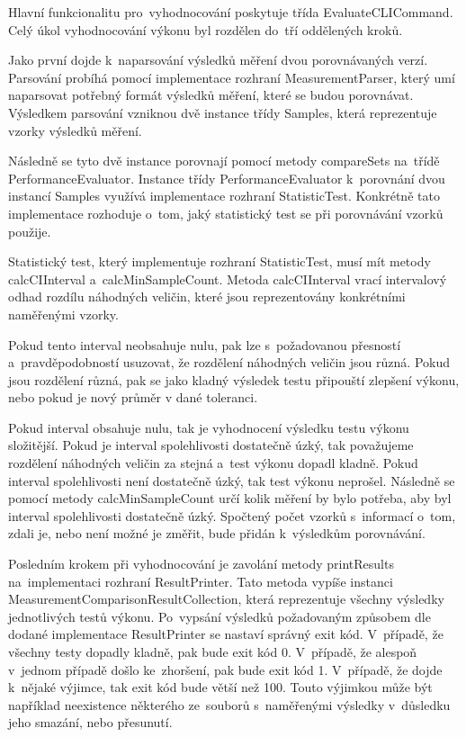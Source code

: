 Hlavní funkcionalitu pro~vyhodnocování poskytuje třída EvaluateCLICommand. Celý úkol vyhodnocování výkonu
byl rozdělen do~tří oddělených kroků.

Jako první dojde k~naparsování výsledků měření dvou porovnávaných verzí. Parsování probíhá pomocí
implementace rozhraní MeasurementParser, který umí naparsovat potřebný formát výsledků měření, které
se budou porovnávat. Výsledkem parsování vzniknou dvě instance třídy Samples, která reprezentuje vzorky
výsledků měření.

Následně se tyto dvě instance porovnají pomocí metody compareSets na~třídě PerformanceEvaluator. Instance třídy
PerformanceEvaluator k~porovnání dvou instancí Samples využívá implementace rozhraní StatisticTest. Konkrétně
tato implementace rozhoduje o~tom, jaký statistický test se při porovnávání vzorků použije.

Statistický test, který implementuje rozhraní StatisticTest, musí mít metody calcCIInterval a~calcMinSampleCount.
Metoda calcCIInterval vrací intervalový odhad rozdílu náhodných veličin, které jsou reprezentovány konkrétními
naměřenými vzorky.

Pokud tento interval neobsahuje nulu, pak lze s~požadovanou přesností a~pravděpodobností usuzovat,
že rozdělení náhodných veličin jsou různá. Pokud jsou rozdělení různá, pak se jako kladný výsledek testu připouští
zlepšení výkonu, nebo pokud je nový průměr v dané toleranci.

Pokud interval obsahuje nulu, tak je vyhodnocení výsledku testu výkonu složitější. Pokud je interval spolehlivosti
dostatečně úzký, tak považujeme rozdělení náhodných veličin za stejná a~test výkonu dopadl kladně. Pokud interval
spolehlivosti není dostatečně úzký, tak test výkonu neprošel. Následně se pomocí metody calcMinSampleCount určí
kolik měření by bylo potřeba, aby byl interval spolehlivosti dostatečně úzký. Spočtený počet vzorků s~informací o~tom,
zdali je, nebo není možné je změřit, bude přidán k~výsledkům porovnávání.

Posledním krokem při vyhodnocování je zavolání metody printResults na~implementaci rozhraní ResultPrinter. Tato metoda
vypíše instanci MeasurementComparisonResultCollection, která reprezentuje všechny výsledky jednotlivých testů výkonu.
Po~vypsání výsledků požadovaným způsobem dle dodané implementace ResultPrinter se nastaví správný exit kód. V~případě,
že všechny testy dopadly kladně, pak bude exit kód 0. V~případě, že alespoň v~jednom případě došlo ke~zhoršení, pak bude
exit kód 1. V~případě, že dojde k~nějaké výjimce, tak exit kód bude větší než 100. Touto výjimkou může být například
neexistence některého ze~souborů s~naměřenými výsledky v~důsledku jeho smazání, nebo přesunutí.

